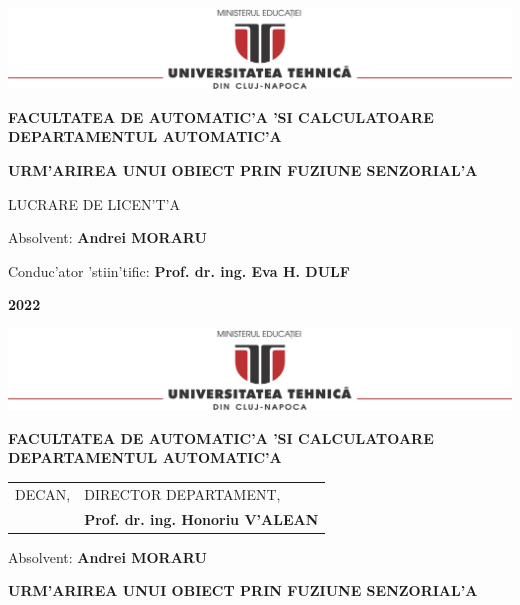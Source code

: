 \documentclass[12pt,a4paper,twoside]{report}
\renewcommand{\thesisauthor}{Andrei MORARU}    %
\renewcommand{\thesisyear}{2022}      %
\renewcommand{\thesistitle}{URM'ARIREA UNUI OBIECT PRIN FUZIUNE SENZORIAL'A} %
\renewcommand{\thesissupervisor}{Prof. dr. ing. Eva H. DULF}
\newcommand{\department}{FACULTATEA DE AUTOMATIC'A 'SI CALCULATOARE\\
DEPARTAMENTUL AUTOMATIC'A}
\newcommand{\thesis}{LUCRARE DE LICEN'T'A}
\newcommand{\utcnlogo}{\includegraphics[width=15cm]{img/utcn.jpg}}
\begin{document}

\newenvironment{definition}[1][Defini'tie.]{\begin{trivlist}
\item[\hskip \labelsep {\bfseries #1}]}{\end{trivlist}}





\begin{center}
\utcnlogo

{\bf \department}

\vspace{4cm}

{\bf \thesistitle} %

\vspace{1.5cm}

\thesis

\vspace{6cm}

Absolvent: {\bf \thesisauthor} 

Conduc'ator 'stiin'tific: {\bf \thesissupervisor}

\vspace{3cm}
{\bf \thesisyear}
\end{center}

\thispagestyle{empty}
\newpage

\begin{center}
\utcnlogo

{\bf \department}
\end{center}
\vspace{0.5cm}

\begin{tabular}{p{7cm}p{8cm}}
 \hspace{-1cm}DECAN, & DIRECTOR DEPARTAMENT,\\
\hspace{-1cm}{\bf Prof. dr. ing. Liviu MICLEA} & {\bf Prof. dr. ing. Honoriu V'ALEAN}\\  
\end{tabular}
 
\vspace{2cm}

\begin{center}
Absolvent: {\bf \thesisauthor}

\vspace{1cm}

{\bf \thesistitle}
\end{center}
\end{document}
